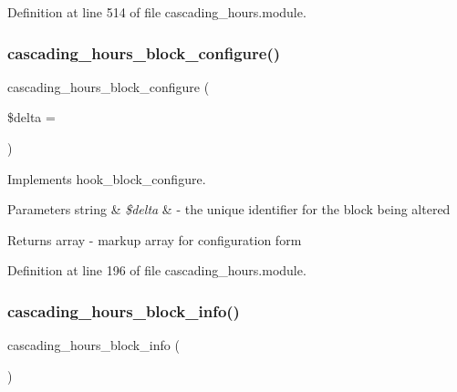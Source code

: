 Definition at line 514 of file cascading\+\_\+hours.\+module.

\mbox{\label{cascading__hours_8module_ac63fffa82bb1bb003baf3c448d17fc70_ac63fffa82bb1bb003baf3c448d17fc70}} 
\subsubsection{\texorpdfstring{cascading\+\_\+hours\+\_\+block\+\_\+configure()}{cascading\_hours\_block\_configure()}}
{\footnotesize\ttfamily cascading\+\_\+hours\+\_\+block\+\_\+configure (\begin{DoxyParamCaption}\item[{}]{\$delta = {\ttfamily \textquotesingle{}\textquotesingle{}} }\end{DoxyParamCaption})}



Implements hook\+\_\+block\+\_\+configure. 


\begin{DoxyParams}[1]{Parameters}
string & {\em \$delta} & -\/ the unique identifier for the block being altered \\
\hline
\end{DoxyParams}
\begin{DoxyReturn}{Returns}
array -\/ markup array for configuration form 
\end{DoxyReturn}


Definition at line 196 of file cascading\+\_\+hours.\+module.

\mbox{\label{cascading__hours_8module_a1132e952a3f3b1f728714f948f2f7e08_a1132e952a3f3b1f728714f948f2f7e08}} 
\subsubsection{\texorpdfstring{cascading\+\_\+hours\+\_\+block\+\_\+info()}{cascading\_hours\_block\_info()}}
{\footnotesize\ttfamily cascading\+\_\+hours\+\_\+block\+\_\+info (\begin{DoxyParamCaption}{ }\end{DoxyParamCaption})}



